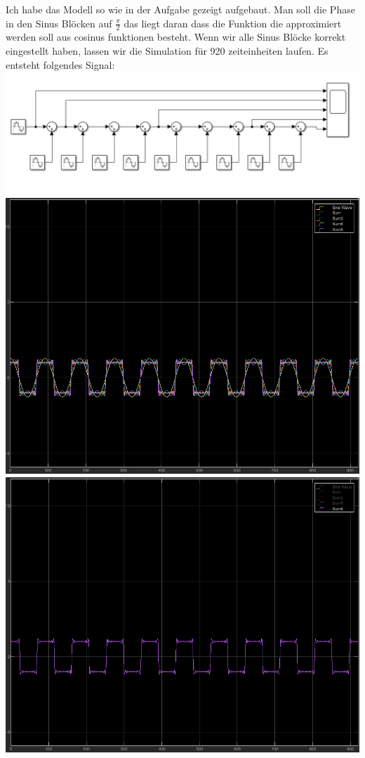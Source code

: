 \documentclass{scrartcl}
\begin{document}
Ich habe das Modell so wie in der Aufgabe gezeigt aufgebaut. Man soll die Phase in den Sinus Blöcken auf $\frac{\pi}{2}$ das liegt daran dass die Funktion die approximiert werden soll aus cosinus funktionen besteht. Wenn wir alle Sinus Blöcke korrekt eingestellt haben, lassen wir die Simulation für 920 zeiteinheiten laufen. Es entsteht folgendes Signal:\\
\includegraphics[scale=0.4]{Fourier_modelpng.png} \\
\includegraphics[scale=0.3]{Fourier_out2.png}
\includegraphics[scale=0.3]{Fourier_out.png} \\
\end{document}
